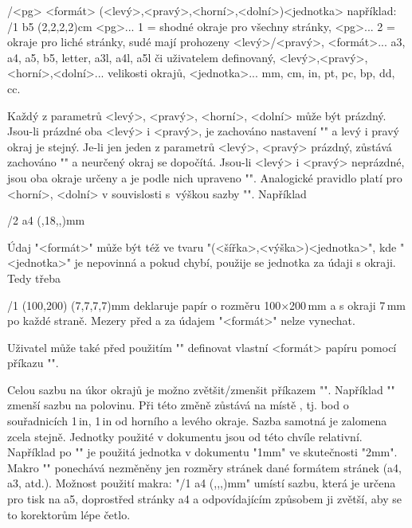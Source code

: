 \begtt 
\margins/<pg> <formát> (<levý>,<pravý>,<horní>,<dolní>)<jednotka>
například: 
\margins/1 b5 (2,2,2,2)cm %
<pg>... 1 = shodné okraje pro všechny stránky,
<pg>... 2 = okraje pro liché stránky, sudé mají prohozeny <levý>/<pravý>,
<formát>... a3, a4, a5, b5, letter, a3l, a4l, a5l či uživatelem definovaný,
<levý>,<pravý>,<horní>,<dolní>... velikosti okrajů,
<jednotka>... mm, cm, in, pt, pc, bp, dd, cc.
\endtt

Každý z parametrů <levý>, <pravý>, <horní>, <dolní> může být prázdný.
Jsou-li prázdné oba <levý> i <pravý>, je zachováno nastavení "\hsize" a
levý i pravý okraj je stejný. Je-li jen jeden z parametrů
<levý>, <pravý> prázdný, zůstává zachováno "\hsize" a neurčený okraj se
dopočítá. Jsou-li <levý> i <pravý> neprázdné, jsou oba okraje určeny 
a je podle nich upraveno "\hsize". 
Analogické pravidlo platí pro <horní>, <dolní> v souvislosti 
s~výškou sazby "\vsize". Například

\begtt
\margins/2 a4 (,18,,)mm  %
\endtt

Údaj "<formát>" může být též ve tvaru "(<šířka>,<výška>)<jednotka>", kde
"<jednotka>" je nepovinná a pokud chybí, použije se jednotka za údaji s
okraji. Tedy třeba

\begtt
\margins/1 (100,200) (7,7,7,7)mm
\endtt
%
deklaruje papír o rozměru 100$\times$200\,mm a s okraji 7\,mm po každé
straně. Mezery před a za údajem "<formát>" nelze vynechat.

Uživatel může také před použitím "\margins" definovat vlastní <formát> papíru pomocí
příkazu "". 
%

Celou sazbu na úkor okrajů je možno zvětšit/zmenšit příkazem
"\magscale[<factor>]". Například "\magscale[500]" zmenší sazbu na polovinu.
Při této změně zůstává na místě , tj. bod o souřadnicích
1\,in, 1\,in od horního a levého okraje. Sazba samotná je zalomena zcela
stejně. Jednotky
použité v dokumentu jsou od této chvíle relativní. Například po
"\magscale[2000]" je použitá jednotka v dokumentu "1mm" ve skutečnosti "2mm".
Makro "\magscale" ponechává nezměněny jen rozměry stránek dané formátem
stránek (a4, a3, atd.). Možnost použití
makra: "\magscale[1414] \margins/1 a4 (,,,)mm" umístí sazbu, která je určena
pro tisk na a5, doprostřed stránky a4 a odpovídajícím způsobem ji zvětší,
aby se to korektorům lépe četlo. 


